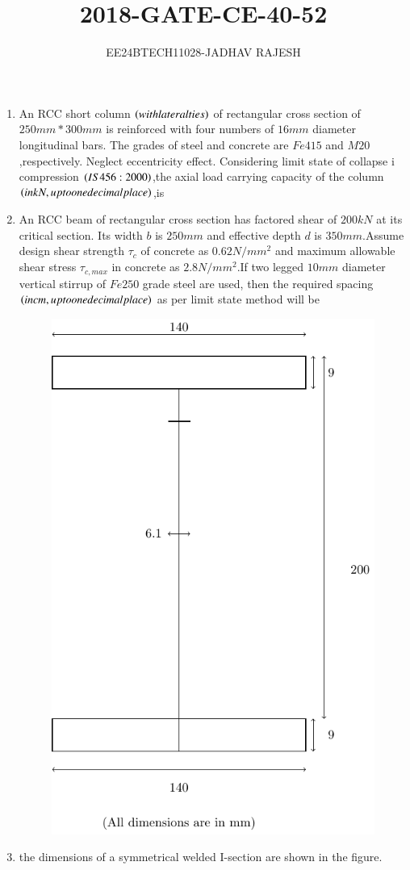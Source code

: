 \documentclass[journal,12pt,twocolumn]{IEEEtran}
\theoremstyle{remark}
\begin{document}

\vspace{3cm}

\title{2018-GATE-CE-40-52}
\author{EE24BTECH11028-JADHAV RAJESH}
\maketitle
\newpage
\bigskip
\begin{enumerate}
    \item An RCC short column $\left(with lateral ties\right)$ of rectangular cross section of $250 mm * 300 mm$ is reinforced with four numbers of $16 mm$ diameter longitudinal bars. The grades of steel and concrete are $Fe415$ and $M20$,respectively. Neglect eccentricity effect. Considering limit state of collapse i  compression $\left(IS 456 : 2000\right)$,the axial load carrying capacity of the column $\left(in kN, up to one decimal place\right)$,is \\
 \item An  RCC beam of rectangular cross section has factored shear of $200 kN$ at its critical section. Its width $b$ is $250 mm$ and effective depth $d$ is $350 mm$.Assume design shear strength $\tau_{c}$ of concrete as $0.62 N/mm^{2}$ and maximum allowable shear stress $\tau_{c,max}$ in concrete as $2.8 N/mm^{2}$.If two legged $10 mm$ diameter vertical stirrup of $Fe250$ grade steel are used, then the required spacing $\left(in cm,up to one decimal place\right)$ as per limit state method will be\\
 \begin{figure}[h!]
  
        \centering
        \includegraphics[width=0.7\linewidth]{figure/fig1/fig1.pdf}
		\caption{}
        \label{stemplot}
\end{figure}
 \item the dimensions of a symmetrical welded I-section are shown in the figure.\\
 

\end{enumerate}
\end{document}
